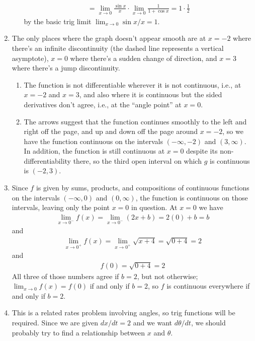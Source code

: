 \documentclass{article}
\newcommand{\ds}{\displaystyle}
\begin{document}
\begin{enumerate}
\begin{enumerate}
\begin{align*}
      = \lim_{x\to 0} \frac{\sin x}{x} \cdot \lim_{x\to 0} \frac{1}{1+\cos x}
      = 1 \cdot \frac{1}{2}
    \end{align*}
    by the basic trig limit $\lim_{x\to 0} \sin x / x = 1$.
  \end{enumerate}
\item The only places where the graph doesn't appear smooth are at $x=-2$ where
  there's an infinite discontinuity
  (the dashed line represents a vertical asymptote), $x=0$ where 
  there's a sudden change of direction, and $x=3$ where there's a jump
  discontinuity.
  \begin{enumerate}
  \item The function is not differentiable wherever it is not continuous,
    i.e., at $x=-2$ and $x=3$, and also where it is continuous but the 
    sided derivatives don't agree, i.e., at the ``angle point'' at $x=0$.
  \item The arrows suggest that the function continues smoothly to the
    left and right off the page, and up and down off the page around $x=-2$,
    so we have the function continuous on the intervals
    $(-\infty,-2)$ and $(3,\infty)$.  In addition, the function is still
    continuous at $x=0$ despite its non-differentiability there, so the 
    third open interval on which $g$ is continuous is $(-2,3)$.
  \end{enumerate}
\item Since $f$ is given by sums, products, and compositions of continuous
  functions on the intervals $(-\infty,0)$ and $(0,\infty)$, the function
  is continuous on those intervals, leaving only the point $x=0$ in question.
  At $x=0$ we have
  \begin{align*}
    \lim_{x\to 0^-} f(x) = \lim_{x\to 0^-} (2x+b)
    = 2(0)+b = b
  \end{align*}
  and 
  \begin{align*}
    \lim_{x\to 0^+} f(x) = \lim_{x\to 0^+} \sqrt{x+4} = \sqrt{0+4} = 2
  \end{align*}
  and
  \begin{align*}
    f(0) = \sqrt{0+4} = 2
  \end{align*}
  All three of those numbers agree if $b=2$, but not otherwise; 
  $\ds\lim_{x\to 0} f(x) = f(0)$ if and only if $b=2$, 
  so $f$ is continuous everywhere if and only if $b=2$.
\item This is a related rates problem involving angles, so trig functions
  will be required.  Since we are given $dx/dt = 2$ and we want $d\theta/dt$, 
  we should probably try to find a relationship between $x$ and $\theta$.

\end{enumerate}
\end{document}
